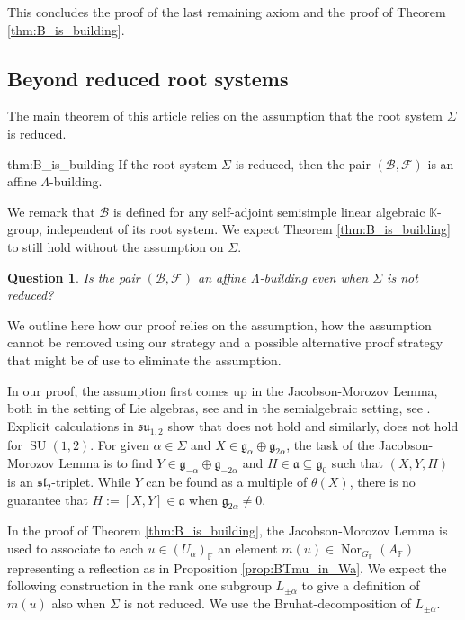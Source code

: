 \documentclass[12pt]{amsart}
\newcommand{\F}{\mathbb{F} }
\newcommand{\K}{\mathbb{K}}
\newcommand{\frakg}{\mathfrak{g}}
\newcommand{\fraka}{\mathfrak{a}}
\newcommand{\Fun}{\mathscr{F}} %
\newcommand{\B}{\mathcal{B}}
\numberwithin{equation}{section}
\newtheorem{question}[theorem]{Question}
\theoremstyle{remark} %
\begin{document}
		\noindent
		This concludes the proof of the last remaining axiom and the proof of Theorem \ref{thm:B_is_building}.
		
		
\subsection{Beyond reduced root systems}\label{sec:beyond}
		
		The main theorem of this article relies on the assumption that the root system $\Sigma$ is reduced.
		\begin{reptheorem}{thm:B_is_building}
			If the root system $\Sigma$ is reduced, then the pair $(\B,\Fun)$ is an affine $\Lambda$-building.
		\end{reptheorem}
		We remark that $\B$ is defined for any self-adjoint semisimple linear algebraic $\K$-group, independent of its root system. We expect Theorem \ref{thm:B_is_building} to still hold without the assumption on $\Sigma$. 
		\begin{question}
			Is the pair $(\B,\Fun)$ an affine $\Lambda$-building even when $\Sigma$ is not reduced?
		\end{question}
		We outline here how our proof relies on the assumption, how the assumption cannot be removed using our strategy and a possible alternative proof strategy that might be of use to eliminate the assumption. 
		
		In our proof, the assumption first comes up in the Jacobson-Morozov Lemma, both in the setting of Lie algebras, see \cite[Lemma \ref{I-lem:JM_basic}]{AppAGRCF} and in the semialgebraic setting, see \cite[Proposition \ref{I-prop:Jacobson_Morozov_real_closed}]{AppAGRCF}. Explicit calculations in $\mathfrak{su}_{1,2}$ show that \cite[Lemma \ref{I-lem:JM_basic}]{AppAGRCF} does not hold and similarly, \cite[Proposition \ref{I-prop:Jacobson_Morozov_real_closed}]{AppAGRCF} does not hold for $\operatorname{SU}(1,2)$. For given $\alpha \in \Sigma$ and $X\in \frakg_\alpha \oplus \frakg_{2\alpha}$, the task of the Jacobson-Morozov Lemma is to find $Y \in \frakg_{-\alpha}\oplus \frakg_{-2\alpha}$ and $H\in \fraka \subseteq \frakg_0$ such that $(X,Y,H)$ is an $\mathfrak{sl}_2$-triplet. While $Y$ can be found as a multiple of $\theta(X)$, there is no guarantee that $H :=[X,Y] \in \fraka$ when $\frakg_{2\alpha}\neq 0$.
		
		In the proof of Theorem \ref{thm:B_is_building}, the Jacobson-Morozov Lemma is used to associate to each $u \in (U_\alpha)_\F$ an element $m(u) \in \operatorname{Nor}_{G_\F}(A_\F)$ representing a reflection as in Proposition \ref{prop:BTmu_in_Wa}. We expect the following construction in the rank one subgroup $L_{\pm \alpha}$ to give a definition of $m(u)$ also when $\Sigma$ is not reduced. We use the Bruhat-decomposition of $L_{\pm\alpha}$.
		
\end{document}
